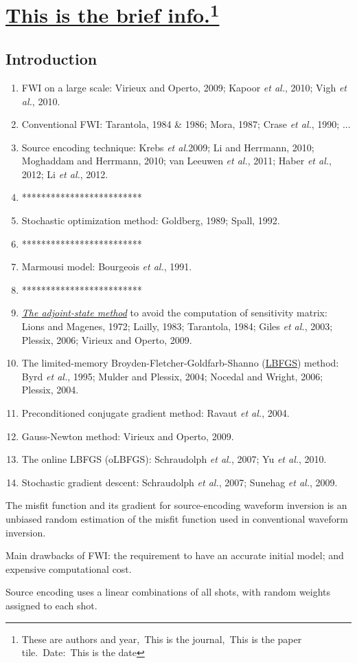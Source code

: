 \documentclass{article}
\newcommand{\Ppath}{/home/tche/Learning/Learning/Paper/}
\newcommand{\prf}{This is relative path from \Papth to the paper file}
\newcommand{\pmk}{This is the brief info.}
\newcommand{\pti}{This is the paper tile}
\newcommand{\pay}{These are authors and year}
\newcommand{\pjo}{This is the journal}
\newcommand{\pda}{This is the date}
\newcommand{\refp}[1]{\href{run:\Ppath\prf}{#1}}
\newcommand{\pinfo}{\refp{\pmk}\footnote{\pay,~\pjo,~\pti.~Date:~\pda}}
\newcommand{\sline}{*************************}
\newcommand{\myem}[1]{{\color{red}\uline{#1}}}
\newcommand{\mynem}[1]{\textsl{\uline{#1}}}
\newcommand{\etal}{\textit{et al.}}
\begin{document}
\section{\pinfo}
\subsection{Introduction}
\begin{enumerate}[\hspace{10mm}*]
  \item FWI on a large scale: Virieux and Operto, 2009; Kapoor \etal, 2010; Vigh \etal, 2010.
  \item Conventional FWI: Tarantola, 1984 \& 1986; Mora, 1987; Crase \etal, 1990; ...
  \item Source encoding technique: Krebs \etal 2009; Li and Herrmann, 2010; Moghaddam and Herrmann, 2010; van Leeuwen \etal, 2011; Haber \etal, 2012; Li \etal, 2012.
  \item \sline
  \item Stochastic optimization method: Goldberg, 1989; Spall, 1992.
  \item \sline
  \item Marmousi model: Bourgeois \etal, 1991.
  \item \sline
  \item \mynem{The adjoint-state method} to avoid the computation of sensitivity matrix: Lions and Magenes, 1972; Lailly, 1983; Tarantola, 1984; Giles \etal, 2003; Plessix, 2006; Virieux and Operto, 2009.
  \item The limited-memory Broyden-Fletcher-Goldfarb-Shanno (\myem{LBFGS}) method: Byrd \etal, 1995; Mulder and Plessix, 2004; Nocedal and Wright, 2006; Plessix, 2004.
  \item Preconditioned conjugate gradient method: Ravaut \etal, 2004.
  \item Gauss-Newton method: Virieux and Operto, 2009.
  \item The online LBFGS (oLBFGS): Schraudolph \etal, 2007; Yu \etal, 2010.
  \item Stochastic gradient descent: Schraudolph \etal, 2007; Sunehag \etal, 2009.
\end{enumerate}\par
The misfit function and its gradient for source-encoding waveform inversion is an unbiased random estimation of the misfit function used in conventional waveform inversion.\par
Main drawbacks of FWI: the requirement to have an accurate initial model; and expensive computational cost.\par
Source encoding uses a linear combinations of all shots, with random weights assigned to each shot.\par
\end{document}
